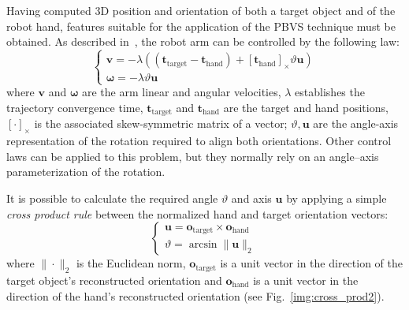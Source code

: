 Having computed 3D position and orientation of both a target object and of the robot hand, features suitable for the application of the \ac{PBVS} technique must be obtained. As described in~\cite{chaumette:visual1}, the robot arm can be controlled by the following law:
%
\begin{equation}\label{eq:cross_prod}
\begin{cases}
\mathbf{v} = -\lambda \left( \left( \mathbf{t}_\textrm{target} - \mathbf{t}_\textrm{hand} \right) + \left[ \mathbf{t}_\textrm{hand}\right]_{\times} \vartheta \mathbf{u} \right)\\
\mathbf{\omega} = -\lambda  \vartheta \mathbf{u}
\end{cases}
\end{equation}
%
where $\mathbf{v}$ and $\mathbf{\omega}$ are the arm linear and angular velocities, $\lambda$ establishes the trajectory convergence time,  $\mathbf{t}_\textrm{target}$ and $\mathbf{t}_\textrm{hand}$ are the target and hand positions, $\left[ \cdot \right]_{\times}$ is the associated skew-symmetric matrix of a vector; $\vartheta, \mathbf{u}$ are the angle-axis representation of the rotation required to align both orientations. Other control laws can be applied to this problem, but they normally rely on an angle--axis parameterization of the rotation.

It is possible to calculate the required angle $\vartheta$ and axis $\mathbf{u}$ by applying a simple \emph{cross product rule} between the normalized hand and target orientation vectors:
%
\begin{equation}
\begin{cases}
\mathbf{u} = {\mathbf{o}}_{\textrm{target}} \times {\mathbf{o}}_{\textrm{hand}}\\
\vartheta = \arcsin \| \mathbf{u} \|_{2}
\end{cases}
\label{eq:theta_angle}
\end{equation}
%
where $\| \cdot \|_{2}$ is the Euclidean norm, ${\mathbf{o}}_{\textrm{target}}$ is a unit vector in the direction of the target object's reconstructed orientation and ${\mathbf{o}}_{\textrm{hand}}$ is a unit vector in the direction of the hand's reconstructed orientation (see Fig.~\ref{img:cross_prod2}).